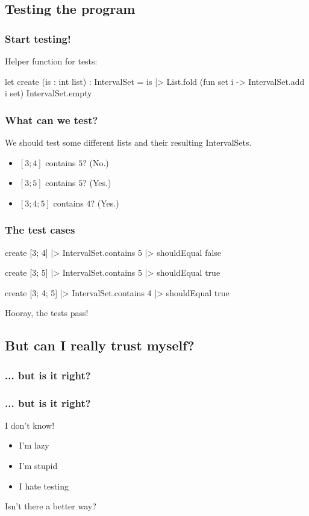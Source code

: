 \documentclass{beamer}
\begin{document}
\subsection{Testing the program}

\begin{frame}[fragile]
\frametitle{Start testing!}
Helper function for tests:
\begin{fslisting}
let create (is : int list) : IntervalSet =
    is
    |> List.fold
        (fun set i -> IntervalSet.add i set)
        IntervalSet.empty
\end{fslisting}
\end{frame}
\begin{frame}
\frametitle{What can we test?}
We should test some different lists and their resulting IntervalSets.

\begin{itemize}
    \item $[3; 4]$ contains $5$? (No.)
    \item $[3; 5]$ contains $5$? (Yes.)
    \item $[3; 4; 5]$ contains $4$? (Yes.)
\end{itemize}
\end{frame}

\begin{frame}[fragile]
\frametitle{The test cases}
\begin{fslisting}
    create [3; 4]
    |> IntervalSet.contains 5
    |> shouldEqual false

    create [3; 5]
    |> IntervalSet.contains 5
    |> shouldEqual true

    create [3; 4; 5]
    |> IntervalSet.contains 4
    |> shouldEqual true
\end{fslisting}
Hooray, the tests pass!
\end{frame}

\subsection{But can I really trust myself?}

\begin{frame}
\frametitle{... but is it right?}
\end{frame}

\begin{frame}
\frametitle{... but is it right?}

I don't know!

\begin{itemize}
\item I'm lazy
\item I'm stupid
\item I hate testing
\end{itemize}

Isn't there a better way?
\end{frame}
\end{document}
